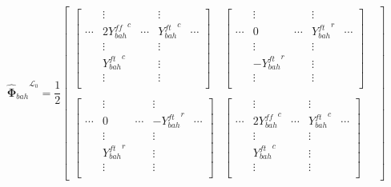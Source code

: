 \documentclass{article}
\begin{document}
\[
    {\mathbf{\hat{\Phi}}_{bah}}^{\mathcal{L}_0} =
    \frac{1}{2}
    \begin{bmatrix}
    \begin{bmatrix}
                & \vdots              &        & \vdots           &              \\
        \cdots  & 2 {Y^{ff}_{bah}}^c  & \cdots & {Y^{ft}_{bah}}^c & \cdots       \\
                & \vdots              &        & \vdots           &              \\
                & {Y^{ft}_{bah}}^c    &        & \vdots           &              \\
                & \vdots              &        & \vdots           &              \\
    \end{bmatrix} &
    \begin{bmatrix}
                & \vdots            &        & \vdots               &              \\
        \cdots  & 0                 & \cdots & {Y^{ft}_{bah}}^r    & \cdots\\
                & \vdots            &        & \vdots               &              \\
                & -{Y^{ft}_{bah}}^r  &        & \vdots               &              \\
                & \vdots            &        & \vdots               &              \\
    \end{bmatrix} \\ \\
    \begin{bmatrix}
                & \vdots            &        & \vdots               &              \\
        \cdots  & 0                 & \cdots & -{Y^{ft}_{bah}}^r     & \cdots\\
                & \vdots            &        & \vdots               &              \\
                & {Y^{ft}_{bah}}^r &        & \vdots               &              \\
                & \vdots            &        & \vdots               &              \\
    \end{bmatrix} &
    \begin{bmatrix}
                & \vdots                &        & \vdots           &              \\
        \cdots  & 2 {Y^{ff}_{bah}}^c    & \cdots & {Y^{ft}_{bah}}^c & \cdots       \\
                & \vdots                &        & \vdots           &              \\
                & {Y^{ft}_{bah}}^c      &        & \vdots           &              \\
                & \vdots                &        & \vdots           &              \\
    \end{bmatrix} &
    \end{bmatrix}
\]
\end{document}
